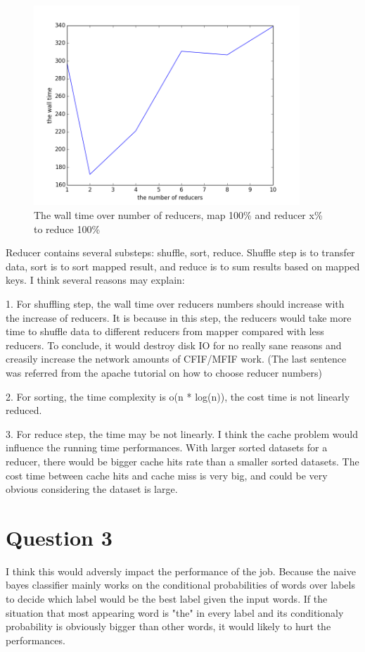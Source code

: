 \documentclass{article} %
\begin{document}
\begin{figure}[h]
\begin{center}
\includegraphics[width=10cm]{pic/figure_2.png}
\end{center}
\caption{The wall time over number of reducers, map 100\% and reducer x\% to
reduce 100\%}
\label{fig:wallTimeOverReducer2}
\end{figure}


Reducer contains several substeps: shuffle, sort, reduce. Shuffle step is to
transfer data, sort is to sort mapped result, and reduce is to sum results based
on mapped keys. I think several reasons may explain:

1. For shuffling step, the wall time over reducers numbers should increase with
the increase of reducers. It is because in this step, the reducers would take
more time to shuffle data to different reducers from mapper compared with less
reducers. To conclude, it would destroy disk IO for no really sane reasons and
creasily increase the network amounts of CFIF/MFIF work. (The last sentence was
referred from the apache tutorial on how to choose reducer numbers)

2. For sorting, the time complexity is o(n * log(n)), the cost time is not
linearly reduced.

3. For reduce step, the time may be not linearly. I think the cache problem
would influence the running time performances. With larger sorted datasets for a
reducer, there would be bigger cache hits rate than a smaller sorted datasets.
The cost time between cache hits and cache miss is very big, and could be very
obvious considering the dataset is large.



\section{Question 3}
I think this would adversly impact the performance of the job. Because the naive bayes
classifier mainly works on the conditional probabilities of words over labels to
decide which label would be the best label given the input words. If the
situation that most appearing word is "the" in every label and its conditionaly
probability is obviously bigger than other words, it would likely to hurt the
performances.
\end{document}
